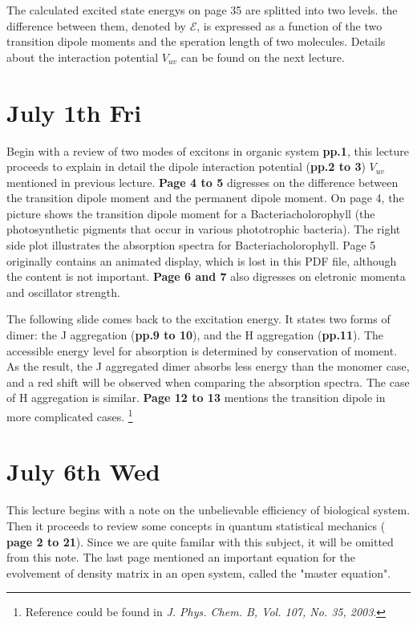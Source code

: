 \documentclass{article}
\numberwithin{equation}{subsection} %
\theoremstyle{definition}
\begin{document}
The calculated excited state energys on page 35 are splitted into
two levels. the difference between them, denoted by $\mathcal{E}$,
is expressed as a function of the two
transition dipole moments and the speration length of two molecules.
Details about the interaction potential $V_{uv}$ can be found on
the next lecture.

\section{July 1th Fri}
\label{sec:July_1th}
Begin with a review of two modes of excitons in organic system
\textbf{pp.1}, this
lecture proceeds to explain in detail the dipole interaction potential
(\textbf{pp.2 to 3})
$V_{uv}$ mentioned in previous lecture. \textbf{Page 4 to 5} digresses on
the difference between the transition dipole moment and the
permanent dipole moment. On page 4, the picture shows the transition dipole
moment for a Bacteriacholorophyll (the photosynthetic pigments that 
occur in various phototrophic bacteria). The right side plot illustrates
the absorption spectra for Bacteriacholorophyll. Page 5 originally
contains an animated display, which is lost in this PDF file, although
the content is not important.
\textbf{Page 6 and 7} also digresses on eletronic momenta and oscillator
strength. 

The following slide comes back to the excitation energy. It states two
forms of dimer: the J aggregation (\textbf{pp.9 to 10}), and the H
aggregation (\textbf{pp.11}). The accessible energy level for absorption
is determined by conservation of moment. As the result, the J aggregated
dimer absorbs less energy than the monomer case, and a red shift will be
observed when comparing the absorption spectra. The case of H aggregation
is similar. \textbf{Page 12 to 13 } mentions the transition dipole in
more complicated cases. \footnote{Reference could be found in \textit{
J. Phys. Chem. B, Vol. 107, No. 35, 2003}.}

\section{July 6th Wed}
\label{sec:July_6th}
This lecture begins with a note on the unbelievable efficiency of biological
system. Then it proceeds to review some concepts in quantum statistical 
mechanics ( \textbf{page 2 to 21}). Since we are quite familar with this
subject, it will be omitted from this note. The last page mentioned an
important equation for the evolvement of density matrix in an open system,
called the "master equation".
\end{document}
